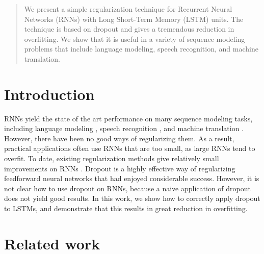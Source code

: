 \documentclass{article}
\begin{document}
 


\begin{abstract} 
  We present a simple regularization technique for Recurrent Neural
  Networks (RNNs) with Long Short-Term Memory (LSTM) units.  The
  technique is based on dropout and gives a tremendous reduction in
  overfitting.  We show that it is useful in a variety of sequence
  modeling problems that include language modeling, speech recognition, and
  machine translation.
\end{abstract} 

\section{Introduction}

RNNs yield the state of the art performance on many sequence modeling
tasks, including language modeling \cite{mikolov2012statistical}, speech recognition
\cite{graves2013speech}, and machine translation \cite{cho2014learning}.
However, there have been no good ways of regularizing them. As a
result, practical applications often use RNNs that are too small, as
large RNNs tend to overfit.  To date, existing regularization methods
give relatively small improvements on RNNs
\cite{graves2013generating}.  Dropout is a highly effective way of
regularizing feedforward neural networks
\cite{srivastava2013improving} that had enjoyed considerable
success. However, it is not clear how to use dropout on RNNs,
because a naive application of dropout does not yield good results.
In this work, we show how to correctly apply dropout to LSTMs, and
demonstrate that this results in great reduction in overfitting.

\section{Related work}
\end{document}
